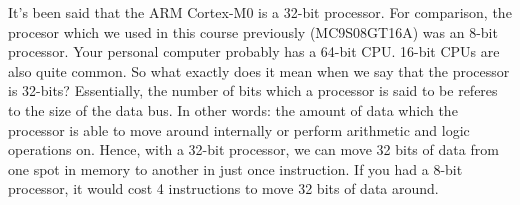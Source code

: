 It's been said that the ARM Cortex-M0 is a 32-bit processor. For comparison, the procesor which we used in this course previously (MC9S08GT16A) was an 8-bit processor. Your personal computer probably has a 64-bit CPU. 16-bit CPUs are also quite common. So what exactly does it mean when we say that the processor is 32-bits? Essentially, the number of bits which a processor is said to be referes to the size of the data bus. In other words: the amount of data which the processor is able to move around internally or perform arithmetic and logic operations on. Hence, with a 32-bit processor, we can move 32 bits of data from one spot in memory to another in just once instruction. If you had a 8-bit processor, it would cost 4 instructions to move 32 bits of data around.  





